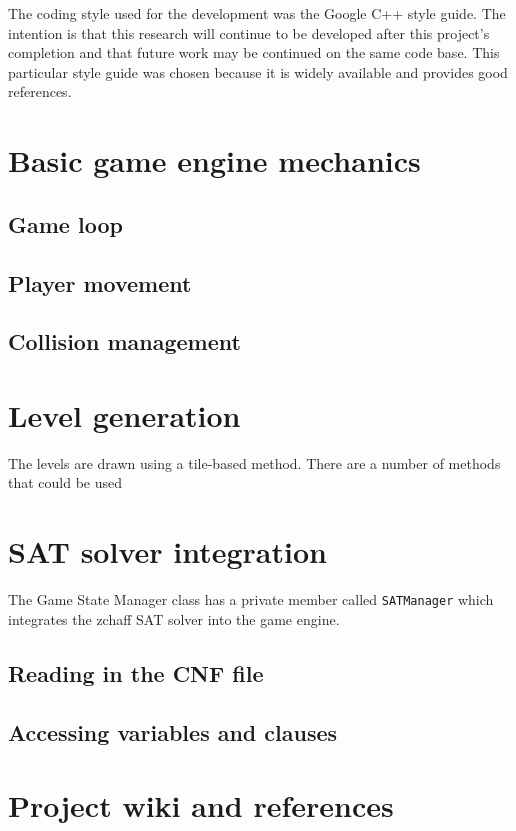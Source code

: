 \documentclass[11pt, a4paper, oneside]{report} %
\begin{document}
The coding style used for the development was the Google C++ style guide. The
intention is that this research will continue to be developed after this
project's completion and  that future work may be continued on the same code
base. This particular style guide was chosen because it is widely available and
provides good references.

\section{Basic game engine mechanics}

\subsection{Game loop}

\subsection{Player movement}

\subsection{Collision management}

\section{Level generation}

The levels are drawn using a tile-based method. There are a number of methods
that could be used

\section{SAT solver integration}

The Game State Manager class has a private member called
\texttt{SAT\textunderscore Manager\textunderscore} which integrates the zchaff
SAT solver into the game engine.

\subsection{Reading in the CNF file}

\subsection{Accessing variables and clauses}

\section{Project wiki and references}
\end{document}
